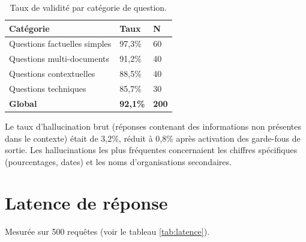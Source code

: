 \documentclass[12pt,a4paper,oneside]{report}
\begin{document}
\begin{table}[htbp]\centering

\begin{tabular}{@{}lll@{}}

\toprule

\textbf{Cat\'{e}gorie} & \textbf{Taux} & \textbf{N} \\

\midrule

Questions factuelles simples & 97,3\% & 60 \\

Questions multi-documents & 91,2\% & 40 \\

Questions contextuelles & 88,5\% & 40 \\

Questions techniques & 85,7\% & 30 \\

\midrule

\textbf{Global} & \textbf{92,1\%} & \textbf{200} \\

\bottomrule

\end{tabular}

\caption{Taux de validit\'{e} par cat\'{e}gorie de question.}\label{tab:validite}

\end{table}



Le taux d'hallucination brut (r\'{e}ponses contenant des informations non pr\'{e}sentes dans le contexte) \'{e}tait de 3,2\%, r\'{e}duit \`{a} 0,8\% apr\`{e}s activation des garde-fous de sortie. Les hallucinations les plus fr\'{e}quentes concernaient les chiffres sp\'{e}cifiques (pourcentages, dates) et les noms d'organisations secondaires.



\section{Latence de r\'{e}ponse}



Mesur\'{e}e sur 500 requ\^{e}tes (voir le tableau \ref{tab:latence}).
\end{document}
